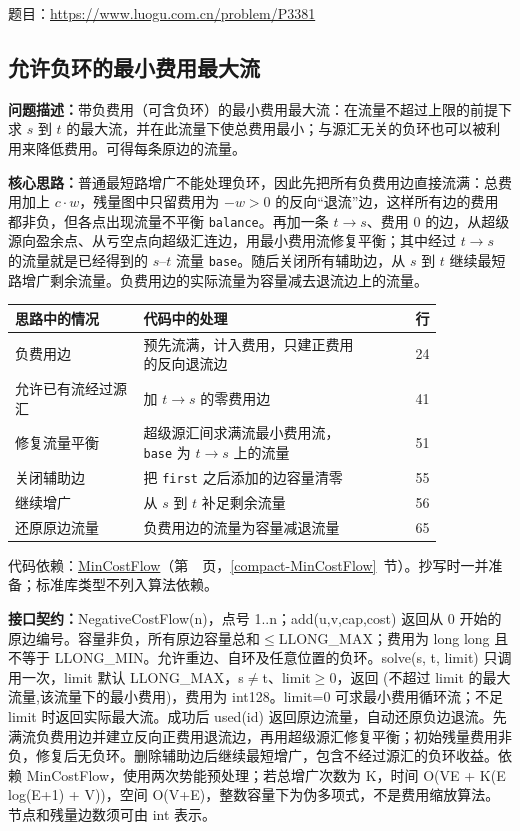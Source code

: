 题目：\url{https://www.luogu.com.cn/problem/P3381}



\subsection{允许负环的最小费用最大流}\label{compact-NegativeCostFlow}

\noindent\textbf{问题描述：}\allowbreak 带负费用（可含负环）的最小费用最大流：在流量不超过上限的前提下求 $s$ 到 $t$ 的最大流，并在此流量下使总费用最小；与源汇无关的负环也可以被利用来降低费用。可得每条原边的流量。

\textbf{核心思路：}\allowbreak 普通最短路增广不能处理负环，因此先把所有负费用边直接流满：总费用加上 $c\cdot w$，残量图中只留费用为 $-w>0$ 的反向“退流”边，这样所有边的费用都非负，但各点出现流量不平衡 \texttt{balance}。再加一条 $t\to s$、费用 0 的边，从超级源向盈余点、从亏空点向超级汇连边，用最小费用流修复平衡；其中经过 $t\to s$ 的流量就是已经得到的 $s$--$t$ 流量 \texttt{base}。随后关闭所有辅助边，从 $s$ 到 $t$ 继续最短路增广剩余流量。负费用边的实际流量为容量减去退流边上的流量。

\begin{center}\small
\begin{tabular}{@{}p{0.30\linewidth}p{0.55\linewidth}r@{}}
\toprule
思路中的情况 & 代码中的处理 & 行\\
\midrule
负费用边 & 预先流满，计入费用，只建正费用的反向退流边 & 24\\
允许已有流经过源汇 & 加 $t\to s$ 的零费用边 & 41\\
修复流量平衡 & 超级源汇间求满流最小费用流，\texttt{base} 为 $t\to s$ 上的流量 & 51\\
关闭辅助边 & 把 \texttt{first} 之后添加的边容量清零 & 55\\
继续增广 & 从 $s$ 到 $t$ 补足剩余流量 & 56\\
还原原边流量 & 负费用边的流量为容量减退流量 & 65\\
\bottomrule
\end{tabular}
\end{center}

代码依赖：\hyperref[compact-MinCostFlow]{MinCostFlow}（第~\pageref{compact-MinCostFlow}~页，\ref{compact-MinCostFlow}~节）。抄写时一并准备；标准库类型不列入算法依赖。

{\sloppy{}\noindent\textbf{接口契约：}NegativeCostFlow(n)，点号 1..n；add(u,v,cap,cost) 返回从 0 开始的原边编号。容量非负，所有原边容量总和$\le$LLONG\_MAX；费用为 long long 且不等于 LLONG\_MIN。允许重边、自环及任意位置的负环。solve(s, t, limit) 只调用一次，limit 默认 LLONG\_MAX，s$\ne$t、limit$\ge$0，返回 (不超过 limit 的最大流量,该流量下的最小费用)，费用为 int128。limit=0 可求最小费用循环流；不足 limit 时返回实际最大流。成功后 used(id) 返回原边流量，自动还原负边退流。先满流负费用边并建立反向正费用退流边，再用超级源汇修复平衡；初始残量费用非负，修复后无负环。删除辅助边后继续最短增广，包含不经过源汇的负环收益。依赖 MinCostFlow，使用两次势能预处理；若总增广次数为 K，时间 O(VE + K(E log(E+1) + V))，空间 O(V+E)，整数容量下为伪多项式，不是费用缩放算法。节点和残量边数须可由 int 表示。\par}

